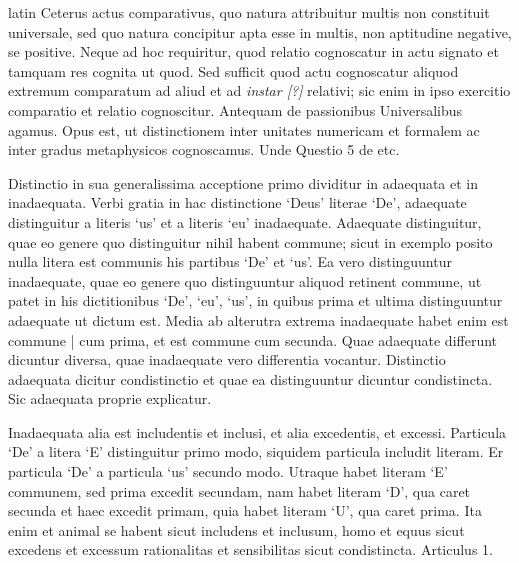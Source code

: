 \begin{otherlanguage*}{latin}
\pstart
Ceterus actus comparativus, quo natura attribuitur multis non constituit universale, sed quo natura concipitur apta esse in multis, non aptitudine negative, se positive. Neque ad hoc requiritur, quod relatio cognoscatur in actu signato et tamquam res cognita ut quod. Sed sufficit quod actu cognoscatur aliquod extremum comparatum ad aliud et ad \emph{instar [?]} relativi; sic enim in ipso exercitio comparatio et relatio cognoscitur. Antequam de passionibus Universalibus agamus. Opus est, ut distinctionem inter unitates numericam et formalem ac inter gradus metaphysicos cognoscamus. Unde Questio 5 de etc. 
\pend

\pstart
{}
\pend

\pstart
Distinctio in sua generalissima acceptione primo dividitur in adaequata et in inadaequata. Verbi gratia in hac distinctione `Deus' literae `De', adaequate distinguitur a literis `us' et a literis `eu' inadaequate. Adaequate distinguitur, quae eo genere quo distinguitur nihil habent commune; sicut in exemplo posito nulla litera est communis his partibus `De' et `us'. Ea vero distinguuntur inadaequate, quae eo genere quo distinguuntur aliquod retinent commune, ut patet in his dictitionibus `De', `eu', `us', in quibus prima et ultima distinguuntur adaequate ut dictum est. Media ab alterutra extrema inadaequate habet enim est commune \textnormal{|} cum prima, et est commune cum secunda. Quae adaequate differunt dicuntur diversa, quae inadaequate vero differentia vocantur. Distinctio adaequata dicitur condistinctio et quae ea distinguuntur dicuntur condistincta. Sic adaequata proprie explicatur. 
\pend

\pstart
Inadaequata alia est includentis et inclusi, et alia excedentis, et excessi. Particula `De' a litera `E' distinguitur primo modo, siquidem particula includit literam. Er particula `De' a particula `us' secundo modo. Utraque habet literam `E' communem, sed prima excedit secundam, nam habet literam `D', qua caret secunda et haec excedit primam, quia habet literam `U', qua caret prima. Ita enim et animal se habent sicut includens et inclusum, homo et equus sicut excedens et excessum rationalitas et sensibilitas sicut condistincta. Articulus 1. 
\pend

\pstart
{}
\pend


\end{otherlanguage*}
